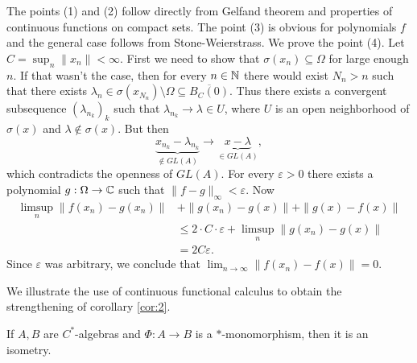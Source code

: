 \begin{myproof}
  The points (1) and (2) follow directly from Gelfand theorem and properties of continuous functions  
  on compact sets. The point (3) is obvious for polynomials $f$ and the general case follows from Stone-Weierstrass.
  We prove the point (4). Let $C = \sup_n \|x_n\| < \infty$. First we need to show that 
  $\sigma(x_n) \subseteq \Omega$ for large enough $n$. If that wasn't the case, then for every $n \in \mathbb {N}$ there would exist $N_n > n$
  such that there exists $\lambda_n \in \sigma(x_{N_n}) \setminus \Omega \subseteq \overline{B_C (0)}$.
  Thus there exists a convergent subsequence $(\lambda_{n_k})_k$ such that $\lambda_{n_k} \to \lambda \in U$,
  where $U$ is an open neighborhood of $\sigma(x)$
  and $\lambda \notin \sigma(x)$. But then $$\underbrace{x_{n_k} - \lambda_{n_k}}_{\notin GL(A)} \to \underbrace{x - \lambda}_{\in GL(A)},$$
  which contradicts the openness of $GL(A)$. For every $\varepsilon > 0$ there exists a polynomial $g: \Omega \to \mathbb {C}$ such that $\|f - g\|_{\infty} < \varepsilon$.
  Now \begin{align*}
    \limsup_{n} \|f(x_n) - g(x_n)\| &+ \|g(x_n) - g(x)\| + \|g(x) - f(x)\|\\
     &\leq 2 \cdot C \cdot \varepsilon + \limsup_{n} \|g(x_n) - g(x)\| \\
     &= 2 C\varepsilon.
  \end{align*}
  Since $\varepsilon$ was arbitrary, we conclude that $\lim_{n \to \infty} \| f(x_n) - f(x)\| = 0$.
\end{myproof}

We illustrate the use of continuous functional calculus to obtain the strengthening of corollary \ref{cor:2}.

\begin{corollary}
    If $A, B$ are $C^*$-algebras and $\Phi: A \to B$ is a $*$-monomorphism,
    then it is an isometry.
\end{corollary}


